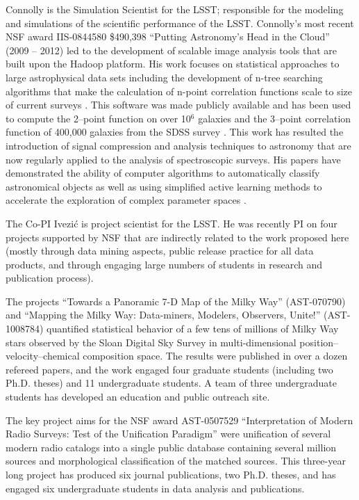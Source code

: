 Connolly is the Simulation Scientist for the LSST; responsible for the
modeling and simulations of the scientific performance of the
LSST. Connolly's most recent NSF award IIS-0844580 \$490,398 ``Putting
Astronomy's Head in the Cloud'' (2009 -- 2012) led to the development
of scalable image analysis tools that are built upon the Hadoop
platform\citep{wiley2011}. His work focuses on statistical approaches
to large astrophysical data sets including the development of n-tree
searching algorithms that make the calculation of n-point correlation
functions scale to size of current surveys \cite{Moore00}. This
software was made publicly available and has been used to compute the
2--point function on over 10$^6$ galaxies and the 3--point correlation
function of 400,000 galaxies from the SDSS survey
\cite{Scranton2002,Szapudi2002,Nichol2006,mcbride2011a,mcbride2011b}. This
work has resulted the introduction of signal compression and analysis
techniques to astronomy that are now regularly applied to the analysis
of spectroscopic surveys. His papers have demonstrated the ability of
computer algorithms to automatically classify astronomical objects
\cite{vdp2009,daniel2011} as well as using simplified active learning
methods to accelerate the exploration of complex parameter spaces
\cite{daniel2012}.

The Co-PI Ivezi\'{c} is project scientist for the LSST. He was
recently PI on four projects supported by NSF that are indirectly
related to the work proposed here (mostly through data mining aspects,
public release practice for all data products, and through engaging
large numbers of students in research and publication process).

The projects ``Towards a Panoramic 7-D Map of the Milky Way''
(AST-070790) and ``Mapping the Milky Way: Data-miners, Modelers,
Observers, Unite!'' (AST-1008784) quantified statistical behavior of a
few tens of millions of Milky Way stars observed by the Sloan Digital
Sky Survey in multi-dimensional position--velocity--chemical
composition space. The results were published in over a dozen refereed
papers, and the work engaged four graduate students (including two
Ph.D. theses) and 11 undergraduate students.  A team of three
undergraduate students has developed an education and public outreach
site.

The key project aims for the NSF award AST-0507529 ``Interpretation of
Modern Radio Surveys: Test of the Unification Paradigm'' were
unification of several modern radio catalogs into a single public
database containing several million sources and morphological
classification of the matched sources. This three-year long project
has produced six journal publications, two Ph.D. theses, and has
engaged six undergraduate students in data analysis and publications.

